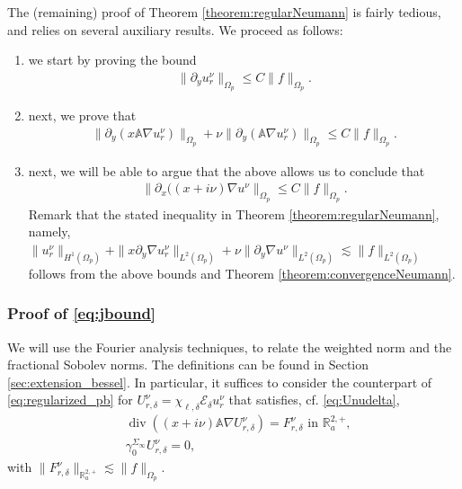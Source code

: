 \documentclass[report]{elsarticle}
\numberwithin{theorem}{section}
\begin{document}
The (remaining) proof of Theorem \ref{theorem:regularNeumann} is fairly tedious, and relies on several auxiliary results. We proceed as follows: 
\begin{enumerate}
	\item we start by proving the bound  
	\begin{align}
		\label{eq:jbound}
		\|\partial_y u^{\nu}_r\|_{\Omega_p}\leq C\|f\|_{\Omega_p}.
	\end{align}

	
	\item next, we prove that   
	\begin{align}
		\label{eq:partialY}
		\|\partial_y(x\mathbb{A}\nabla u^{\nu}_{r})\|_{\Omega_p}+\nu\|\partial_y (\mathbb{A}\nabla u^{\nu}_r)\|_{\Omega_p}\leq C\|f\|_{\Omega_p}.	
	\end{align} 
	\item next, we will be able to argue that the above allows us to conclude that \begin{align}
		\label{eq:dxu}
		\|\partial_x((x+i\nu)\nabla u^{\nu}\|_{\Omega_p}\leq C\|f\|_{\Omega_p}.
	\end{align} 
Remark that the stated inequality in Theorem \ref{theorem:regularNeumann}, namely,   $\|u^{\nu}_r\|_{H^1(\Omega_p)}+\|x\partial_y \nabla u^{\nu}_r\|_{L^2(\Omega_p)}+\nu\|\partial_y\nabla u^{\nu}\|_{L^2(\Omega_p)}\lesssim \|f\|_{L^2(\Omega_p)}$ follows from the above bounds and Theorem \ref{theorem:convergenceNeumann}. 
\end{enumerate}
\subsubsection{Proof of \eqref{eq:jbound}}
\label{sec:dyu}
We will use the Fourier analysis techniques, to relate the weighted norm and the fractional Sobolev norms. 
 The definitions can be found in Section \ref{sec:extension_bessel}. In particular, it suffices to consider the counterpart of \eqref{eq:regularized_pb} for $U^{\nu}_{r,\delta}=\chi_{\ell,\delta}\mathcal{E}_{\delta}u^{\nu}_r$ that satisfies, cf. \eqref{eq:Unudelta},  
\begin{align*}
	&\operatorname{div}((x+i\nu)\mathbb{A}\nabla U^{\nu}_{r,\delta})=F^{\nu}_{r,\delta} \text{ in }\mathbb{R}^{2,+}_{a},\\
	&\gamma_{0}^{\Sigma_{\infty}}U^{\nu}_{r,\delta}=0,
\end{align*}
with $\|F^{\nu}_{r,\delta}\|_{\mathbb{R}^{2,+}_a}\lesssim \|f\|_{\Omega_p}$. 
\end{document}

